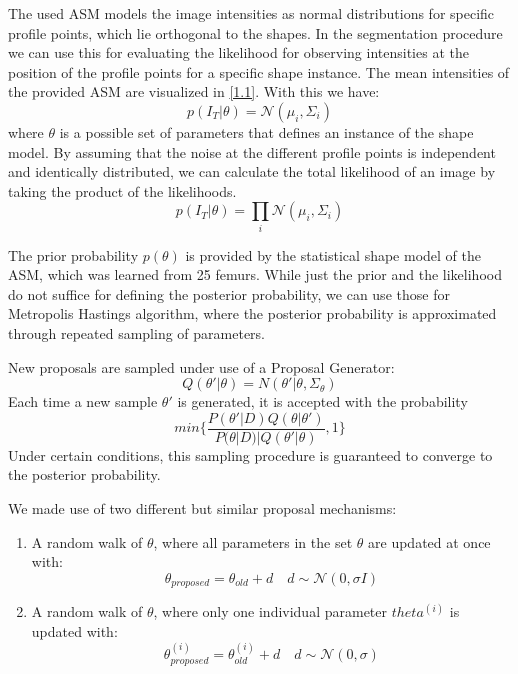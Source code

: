 \documentclass{article}
\begin{document}
	The used ASM models the image intensities as normal distributions for specific profile points, which lie orthogonal to the shapes.
	In the segmentation procedure we can use this for evaluating the likelihood for observing intensities at the position of the profile points for a specific shape instance.
	The mean intensities of the provided ASM are visualized in \autoref{1.1}.
	With this we have:
	\begin{equation}
	p(I_T | \theta) = \mathcal{N}(\mu_i, \Sigma_i) 
	\end{equation}
	where $\theta$ is a possible set of parameters that defines an instance of the shape model.
	By assuming that the noise at the different profile points is independent and identically distributed, we can calculate the total likelihood of an image by taking the product of the likelihoods.	
	\begin{equation}
	p(I_T|\theta) = \prod_{i} \mathcal{N}(\mu_i, \Sigma_i)
	\end{equation}
	
	The prior probability $p(\theta)$ is provided by the statistical shape model of the ASM, which was learned from 25 femurs.
	While just the prior and the likelihood do not suffice for defining the posterior probability, we can use those for Metropolis Hastings algorithm, where the posterior probability is approximated through repeated sampling of parameters.
	
	New proposals are sampled under use of a Proposal Generator:
	\begin{equation}
	Q(\theta' | \theta) = N(\theta'|\theta, \Sigma_\theta)
	\end{equation}
	Each time a new sample $\theta'$ is generated, it is accepted with the probability 
	\begin{equation}
	min \{ \frac{P(\theta' | D ) Q(\theta|\theta')}{P(\theta|D) | Q(\theta'|\theta)}, 1\}
	\end{equation}
	Under certain conditions, this sampling procedure is guaranteed to converge to the posterior probability.
	
	We made use of two different but similar proposal mechanisms:
	\begin{enumerate}
		\item A random walk of $\theta$, where all parameters in the set $\theta$ are updated at once with: 
		$$\theta_{proposed} = \theta_{old} + d \quad d \sim \mathcal{N}(0,\sigma I)$$
		\item A random walk of $\theta$, where only one individual parameter $theta^{(i)}$ is updated with: 
		$$\theta_{proposed}^{(i)} = \theta_{old}^{(i)} + d \quad d \sim \mathcal{N}(0,\sigma)$$
	\end{enumerate}
	
\end{document}
